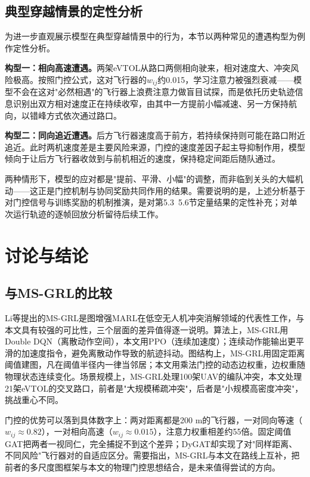 \documentclass[12pt,a4paper,UTF8]{ctexart}
\begin{document}
\subsection{典型穿越情景的定性分析}

为进一步直观展示模型在典型穿越情景中的行为，本节以两种常见的遭遇构型为例作定性分析。

\textbf{构型一：相向高速遭遇。}两架eVTOL从路口两侧相向驶来，相对速度大、冲突风险极高。按照门控公式，这对飞行器的$w_{ij}$约0.015，学习注意力被强烈衰减——模型不会在这对"必然相遇"的飞行器上浪费注意力做盲目试探，而是依托历史轨迹信息识别出双方相对速度正在持续收窄，由其中一方提前小幅减速、另一方保持航向，以错峰方式依次通过路口。

\textbf{构型二：同向追近遭遇。}后方飞行器速度高于前方，若持续保持则可能在路口附近追近。此时两机速度差是主要风险来源，门控的速度差因子起主导抑制作用，模型倾向于让后方飞行器收敛到与前机相近的速度，保持稳定间距后随队通过。

两种情形下，模型的应对都是"提前、平滑、小幅"的调整，而非临到关头的大幅机动——这正是门控机制与协同奖励共同作用的结果。需要说明的是，上述分析基于对门控信号与训练奖励的机制推演，是对第5.3~5.6节定量结果的定性补充；对单次运行轨迹的逐帧回放分析留待后续工作。

\section{讨论与结论}

\subsection{与MS-GRL的比较}

Li等\cite{ref10}提出的MS-GRL是图增强MARL在低空无人机冲突消解领域的代表性工作，与本文具有较强的可比性，三个层面的差异值得逐一说明。算法上，MS-GRL用Double DQN（离散动作空间），本文用PPO（连续加速度）；连续动作能输出更平滑的加速度指令，避免离散动作导致的航迹抖动。图结构上，MS-GRL用固定距离阈值建图，凡在阈值半径内一律当邻居；本文用乘法门控的动态边权重，边权重随物理状态连续变化。场景规模上，MS-GRL处理100架UAV的编队冲突，本文处理21架eVTOL的交叉路口，前者是"大规模稀疏冲突"，后者是"小规模高密度冲突"，挑战重心不同。

门控的优势可以落到具体数字上：两对距离都是200 m的飞行器，一对同向等速（$w_{ij}\approx0.82$），一对相向高速（$w_{ij}\approx0.015$），注意力权重相差约55倍。固定阈值GAT把两者一视同仁，完全捕捉不到这个差异；DyGAT却实现了对"同样距离、不同风险"飞行器对的自适应区分。需要指出，MS-GRL与本文在路线上互补，把前者的多尺度图框架与本文的物理门控思想结合，是未来值得尝试的方向。
\end{document}
